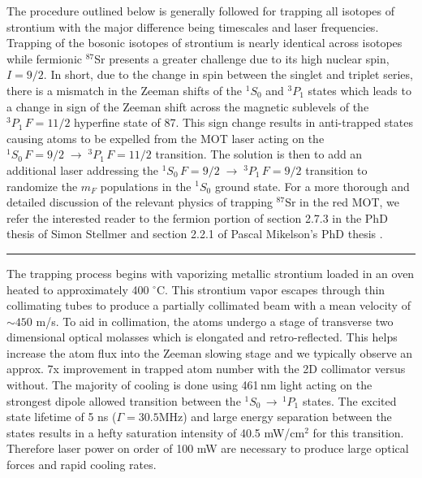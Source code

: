 The procedure outlined below is generally followed for trapping all isotopes of strontium with the major difference being timescales and laser frequencies.
Trapping of the bosonic isotopes of strontium is nearly identical across isotopes while fermionic $^{87}$Sr presents a greater challenge due to its high nuclear spin, $I=9/2$.
In short, due to the change in spin between the singlet and triplet series, there is a mismatch in the Zeeman shifts of the $^1S_0$ and $^3P_1$ states which leads to a change in sign of the Zeeman shift across the magnetic sublevels of the $^3P_1\,F=11/2$ hyperfine state of 87.
This sign change results in anti-trapped states causing atoms to be expelled from the MOT laser acting on the $^1S_0\,F=9/2\;\rightarrow\;^3P_1\,F=11/2$ transition.
The solution is then to add an additional laser addressing the $^1S_0\,F=9/2\;\rightarrow\;^3P_1\,F=9/2$ transition to randomize the $m_F$ populations in the $^1S_0$ ground state.
For a more thorough and detailed discussion of the relevant physics of trapping $^{87}$Sr in the red MOT, we refer the interested reader to the fermion portion of section 2.7.3 in the PhD thesis of Simon Stellmer \cite{SimonStellmer2013} and section 2.2.1 of Pascal Mikelson's PhD thesis \cite{Mickelson2010b}.

\noindent \rule{75pt}{0.5pt} \newline
The trapping process begins with vaporizing metallic strontium loaded in an oven heated to approximately 400 $^{\circ}$C. 
This strontium vapor escapes through thin collimating tubes to produce a partially collimated beam with a mean velocity of $\sim450$ m/s.
To aid in collimation, the atoms undergo a stage of transverse two dimensional optical molasses which is elongated and retro-reflected.
This helps increase the atom flux into the Zeeman slowing stage and we typically observe an approx. 7x improvement in trapped atom number with the 2D collimator versus without.
The majority of cooling is done using 461\,nm light acting on the strongest dipole allowed transition between the $^1S_0\,\rightarrow\,^1P_1$ states.
The excited state lifetime of 5 ns ($\Gamma=30.5$MHz) and large energy separation between the states results in a hefty saturation intensity of 40.5 mW/cm$^2$ for this transition.
Therefore laser power on order of 100 mW are necessary to produce large optical forces and rapid cooling rates.

